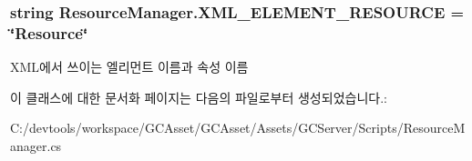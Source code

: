 \subsubsection[{X\+M\+L\+\_\+\+E\+L\+E\+M\+E\+N\+T\+\_\+\+R\+E\+S\+O\+U\+R\+C\+E}]{\setlength{\rightskip}{0pt plus 5cm}string Resource\+Manager.\+X\+M\+L\+\_\+\+E\+L\+E\+M\+E\+N\+T\+\_\+\+R\+E\+S\+O\+U\+R\+C\+E = \char`\"{}Resource\char`\"{}\hspace{0.3cm}{\ttfamily [static]}}\label{class_resource_manager_a1ab2338caffe52ed804c94b05b26a5c1}
X\+M\+L에서 쓰이는 엘리먼트 이름과 속성 이름 

이 클래스에 대한 문서화 페이지는 다음의 파일로부터 생성되었습니다.\+:\begin{DoxyCompactItemize}
\item 
C\+:/devtools/workspace/\+G\+C\+Asset/\+G\+C\+Asset/\+Assets/\+G\+C\+Server/\+Scripts/Resource\+Manager.\+cs\end{DoxyCompactItemize}

